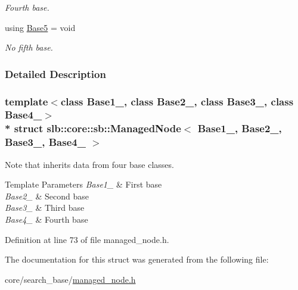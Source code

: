 \begin{DoxyCompactItemize}
\begin{DoxyCompactList}\small\item\em Fourth base. \end{DoxyCompactList}\item 
using \hyperlink{structslb_1_1core_1_1sb_1_1ManagedNode_3_01Base1___00_01Base2___00_01Base3___00_01Base4___01_4_a4a351b2aa2f4f4aa3b07f99ae05c467e}{Base5} = void\hypertarget{structslb_1_1core_1_1sb_1_1ManagedNode_3_01Base1___00_01Base2___00_01Base3___00_01Base4___01_4_a4a351b2aa2f4f4aa3b07f99ae05c467e}{}\label{structslb_1_1core_1_1sb_1_1ManagedNode_3_01Base1___00_01Base2___00_01Base3___00_01Base4___01_4_a4a351b2aa2f4f4aa3b07f99ae05c467e}

\begin{DoxyCompactList}\small\item\em No fifth base. \end{DoxyCompactList}\end{DoxyCompactItemize}


\subsubsection{Detailed Description}
\subsubsection*{template$<$class Base1\+\_\+, class Base2\+\_\+, class Base3\+\_\+, class Base4\+\_\+$>$\\*
struct slb\+::core\+::sb\+::\+Managed\+Node$<$ Base1\+\_\+, Base2\+\_\+, Base3\+\_\+, Base4\+\_\+ $>$}

Note that inherits data from four base classes. 


\begin{DoxyTemplParams}{Template Parameters}
{\em Base1\+\_\+} & First base \\
\hline
{\em Base2\+\_\+} & Second base \\
\hline
{\em Base3\+\_\+} & Third base \\
\hline
{\em Base4\+\_\+} & Fourth base \\
\hline
\end{DoxyTemplParams}


Definition at line 73 of file managed\+\_\+node.\+h.



The documentation for this struct was generated from the following file\+:\begin{DoxyCompactItemize}
\item 
core/search\+\_\+base/\hyperlink{managed__node_8h}{managed\+\_\+node.\+h}\end{DoxyCompactItemize}
